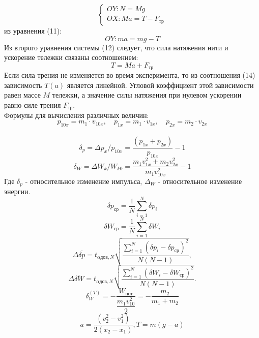 \documentclass[a4paper]{article}
\begin{document}
\begin{equation}
	\begin{cases}
		OY: N=Mg\\
		OX: Ma=T-F_{\text{тр}}
	\end{cases}
\end{equation}
из уравнения (11):
\begin{equation}
	OY: ma=mg-T
\end{equation}
Из второго уравнения системы (12) следует, что сила натяжения
нити и ускорение тележки связаны соотношением:
\begin{equation}
T=Ma+F_{\text{тр}}
\end{equation}
Если сила трения не изменяется во время эксперимента, то из соотношения (14) зависимость $T(a)$ является линейной. Угловой коэффициент этой зависимости равен массе $M$ тележки, а значение
силы натяжения при нулевом ускорении равно силе трения $F_{\text{тр}}$.\\
Формулы для вычисления различных величин:
\begin{equation}
p_{10x} = m_1 \cdot v_{10x},\quad p_{1x} = m_1 \cdot v_{1x}, \quad p_{2x} = m_2 \cdot v_{2x}
\end{equation}\\
\begin{equation}
	\delta_p=\Delta p_x/p_{10x}=\dfrac{(p_{1x}+p_{2x})}{p_{10x}}-1
\end{equation}
\begin{equation}
	\delta_W=\Delta W_k/W_{k0}=\dfrac{m_1v^2_{1x}+m_2v^2_{2x}}{m_1v^2_{10x}}-1
\end{equation}
Где $\delta_p$ - относительное изменение импульса, $\Delta_W$ - относительное изменение энергии.\\
\begin{equation}
\delta p_{\text{ср}} = \frac{1}{N} \sum_{i=1}^{N} \delta p_i
\end{equation}
\begin{equation}
\delta W_{\text{ср}} = \frac{1}{N} \sum_{i=1}^{N} \delta W_i
\end{equation}
\begin{equation}
\Delta \overline{\delta p} = t_{\alpha \text{дов},N} \sqrt{\frac{ \sum_{i=1}^{N} (\delta p_i - \delta p_{\text{ср}})^2 }{N(N - 1)}},
\end{equation}
\begin{equation}
\Delta \overline{\delta W} = t_{\alpha \text{дов},N} \sqrt{\frac{ \sum_{i=1}^{N} (\delta W_i - \delta W_{\text{ср}})^2 }{N(N - 1)}}.
\end{equation}
\begin{equation}
	\delta_W^{(T)}=-\dfrac{W_{\text{пот}}}{\dfrac{m_1v^2_{10}}{2}}=-\dfrac{m_2}{m_1+m_2}
\end{equation}
\begin{equation}
a=\dfrac{(v_2^2-v_1^2)}{2(x_2-x_1)}, T=m(g-a)
\end{equation}
\end{document}
